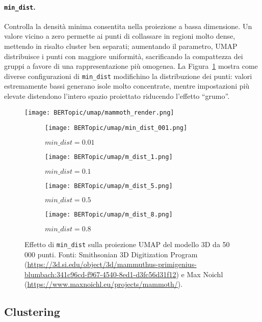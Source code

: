 \paragraph{\texttt{min\_dist}.} Controlla la densità minima consentita nella proiezione a bassa dimensione. Un valore vicino a zero permette ai punti di collassare in regioni molto dense, mettendo in risalto cluster ben separati; aumentando il parametro, UMAP distribuisce i punti con maggiore uniformità, sacrificando la compattezza dei gruppi a favore di una rappresentazione più omogenea. La Figura~\ref{fig:umap-min-dist} mostra come diverse configurazioni di \texttt{min\_dist} modifichino la distribuzione dei punti: valori estremamente bassi generano isole molto concentrate, mentre impostazioni più elevate distendono l'intero spazio proiettato riducendo l'effetto ``grumo''.

\begin{figure}[H]
\centering
\texttt{[image: BERTopic/umap/mammoth\_render.png]}

\begin{subfigure}{0.45\textwidth}
    \centering
    \texttt{[image: BERTopic/umap/min\_dist\_001.png]}
    \caption{$min\_dist = 0.01$}
\end{subfigure}
\hfill
\begin{subfigure}{0.45\textwidth}
    \centering
    \texttt{[image: BERTopic/umap/m\_dist\_1.png]}
    \caption{$min\_dist = 0.1$}
\end{subfigure}

\vspace{0.5em}
\begin{subfigure}{0.45\textwidth}
    \centering
    \texttt{[image: BERTopic/umap/m\_dist\_5.png]}
    \caption{$min\_dist = 0.5$}
\end{subfigure}
\hfill
\begin{subfigure}{0.45\textwidth}
    \centering
    \texttt{[image: BERTopic/umap/m\_dist\_8.png]}
    \caption{$min\_dist = 0.8$}
\end{subfigure}
\caption{Effetto di \texttt{min\_dist} sulla proiezione UMAP del modello 3D da 50\,000 punti. Fonti: Smithsonian 3D Digitization Program (\url{https://3d.si.edu/object/3d/mammuthus-primigenius-blumbach:341c96cd-f967-4540-8ed1-d3fc56d31f12}) e Max Noichl (\url{https://www.maxnoichl.eu/projects/mammoth/}).}
\label{fig:umap-min-dist}
\end{figure}

\subsection{Clustering}


